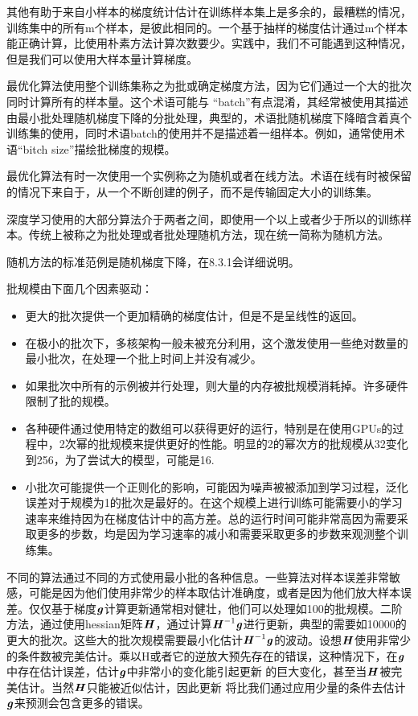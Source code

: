 其他有助于来自小样本的梯度统计估计在训练样本集上是多余的，最糟糕的情况，训练集中的所有m个样本，是彼此相同的。一个基于抽样的梯度估计通过m个样本能正确计算，比使用朴素方法计算次数要少。实践中，我们不可能遇到这种情况，但是我们可以使用大样本量计算梯度。

最优化算法使用整个训练集称之为批或确定梯度方法，因为它们通过一个大的批次同时计算所有的样本量。这个术语可能与 “batch”有点混淆，其经常被使用其描述由最小批处理随机梯度下降的分批处理，典型的，术语批随机梯度下降暗含着真个训练集的使用，同时术语batch的使用并不是描述着一组样本。例如，通常使用术语“bitch size”描绘批梯度的规模。

最优化算法有时一次使用一个实例称之为随机或者在线方法。术语在线有时被保留的情况下来自于，从一个不断创建的例子，而不是传输固定大小的训练集。

深度学习使用的大部分算法介于两者之间，即使用一个以上或者少于所以的训练样本。传统上被称之为批处理或者批处理随机方法，现在统一简称为随机方法。

随机方法的标准范例是随机梯度下降，在8.3.1会详细说明。

批规模由下面几个因素驱动：
\begin{itemize}
\item 更大的批次提供一个更加精确的梯度估计，但是不是呈线性的返回。
\item 在极小的批次下，多核架构一般未被充分利用，这个激发使用一些绝对数量的最小批次，在处理一个批上时间上并没有减少。
\item 如果批次中所有的示例被并行处理，则大量的内存被批规模消耗掉。许多硬件限制了批的规模。
\item 各种硬件通过使用特定的数组可以获得更好的运行，特别是在使用GPUs的过程中，2次幂的批规模来提供更好的性能。明显的2的幂次方的批规模从32变化到256，为了尝试大的模型，可能是16.
\item 小批次可能提供一个正则化的影响，可能因为噪声被被添加到学习过程，泛化误差对于规模为1的批次是最好的。在这个规模上进行训练可能需要小的学习速率来维持因为在梯度估计中的高方差。总的运行时间可能非常高因为需要采取更多的步数，均是因为学习速率的减小和需要采取更多的步数来观测整个训练集。
\end{itemize}

不同的算法通过不同的方式使用最小批的各种信息。一些算法对样本误差非常敏感，可能是因为他们使用非常少的样本取估计准确度，或者是因为他们放大样本误差。仅仅基于梯度$\boldsymbol{\mathit{g}}$计算更新通常相对健壮，他们可以处理如100的批规模。二阶方法，通过使用hessian矩阵$\boldsymbol{\mathit{H}}$，通过计算$\boldsymbol{\mathit{H}}^{-1}\boldsymbol{\mathit{g}}$进行更新，典型的需要如10000的更大的批次。这些大的批次规模需要最小化估计$\boldsymbol{\mathit{H}}^{-1}\boldsymbol{\mathit{g}}$的波动。设想$\boldsymbol{\mathit{H}}$使用非常少的条件数被完美估计。乘以H或者它的逆放大预先存在的错误，这种情况下，在$\boldsymbol{\mathit{g}}$中存在估计误差，估计$\boldsymbol{\mathit{g}}$中非常小的变化能引起更新 的巨大变化，甚至当$\boldsymbol{\mathit{H}}$被完美估计。当然$\boldsymbol{\mathit{H}}$只能被近似估计，因此更新 将比我们通过应用少量的条件去估计$\boldsymbol{\mathit{g}}$来预测会包含更多的错误。

